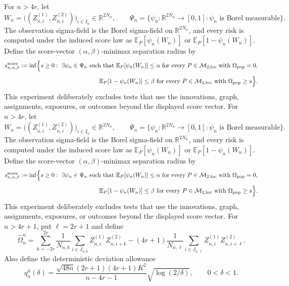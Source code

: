 For \(n>4r\), let
\[
 W_n=\bigl((Z_{n,i}^{(1)},Z_{n,i}^{(2)})\bigr)_{i\in I_n}
 \in\mathbb R^{2N_n},
 \qquad
 \Psi_n=\{\psi_n:\mathbb R^{2N_n}\to[0,1]:\psi_n\text{ is Borel measurable}\}.
\]
The observation sigma-field is the Borel sigma-field on \(\mathbb R^{2N_n}\), and every risk is computed under the induced score law as \(\mathbb E_P[\psi_n(W_n)]\) or \(\mathbb E_P[1-\psi_n(W_n)]\).  Define the score-vector \((\alpha,\beta)\)-minimax separation radius by
\[
 s_{n,\alpha,\beta}^{\mathrm{score}}
 :=\inf\Bigl\{s\ge0:\ \exists\psi_n\in\Psi_n\text{ such that }
 \mathbb E_P[\psi_n(W_n)]\le\alpha
 \text{ for every }P\in\mathcal M_{2,\mathrm{loc}}
 \text{ with }\Omega_{\mathrm{pop}}=0,
\]
\[
 \hspace{54mm}
 \mathbb E_P[1-\psi_n(W_n)]\le\beta
 \text{ for every }P\in\mathcal M_{2,\mathrm{loc}}
 \text{ with }\Omega_{\mathrm{pop}}\ge s\Bigr\}.
\]
This experiment deliberately excludes tests that use the innovations, graph, assignments, exposures, or outcomes beyond the displayed score vector.
For \(n>4r\), let
\[
 W_n=\bigl((Z_{n,i}^{(1)},Z_{n,i}^{(2)})\bigr)_{i\in I_n}
 \in\mathbb R^{2N_n},
 \qquad
 \Psi_n=\{\psi_n:\mathbb R^{2N_n}\to[0,1]:\psi_n\text{ is Borel measurable}\}.
\]
The observation sigma-field is the Borel sigma-field on \(\mathbb R^{2N_n}\), and every risk is computed under the induced score law as \(\mathbb E_P[\psi_n(W_n)]\) or \(\mathbb E_P[1-\psi_n(W_n)]\).  Define the score-vector \((\alpha,\beta)\)-minimax separation radius by
\[
 s_{n,\alpha,\beta}^{\mathrm{score}}
 :=\inf\Bigl\{s\ge0:\ \exists\psi_n\in\Psi_n\text{ such that }
 \mathbb E_P[\psi_n(W_n)]\le\alpha
 \text{ for every }P\in\mathcal M_{2,\mathrm{loc}}
 \text{ with }\Omega_{\mathrm{pop}}=0,
\]
\[
 \hspace{54mm}
 \mathbb E_P[1-\psi_n(W_n)]\le\beta
 \text{ for every }P\in\mathcal M_{2,\mathrm{loc}}
 \text{ with }\Omega_{\mathrm{pop}}\ge s\Bigr\}.
\]
This experiment deliberately excludes tests that use the innovations, graph, assignments, exposures, or outcomes beyond the displayed score vector.
For \(n>4r+1\), put \(\ell=2r+1\) and define
\[
 \widehat\Omega_n^{\mathrm u}
 =\sum_{k=-2r}^{2r}
 \frac1{N_{n,k}}\sum_{i\in J_{n,k}}
 Z_{n,i}^{(1)}Z_{n,i+k}^{(2)}
 -(4r+1)\frac1{N_{n,\ell}}\sum_{i\in J_{n,\ell}}
 Z_{n,i}^{(1)}Z_{n,i+\ell}^{(2)}.
\]
Also define the deterministic deviation allowance
\[
 q_n^{\mathrm u}(\delta)
 =\frac{\sqrt{48n}(2r+1)(4r+1)K^2}{n-4r-1}
 \sqrt{\log(2/\delta)},
 \qquad 0<\delta<1.
\]
